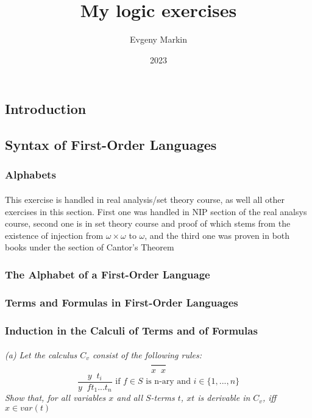 \documentclass[11pt,oneside,titlepage]{book}
\title{My logic exercises}
\author{Evgeny Markin}
\date{2023}
\DeclareMathOperator \spc {\text{ }}
\newcommand{\set}[1]{\{ #1 \}}
\begin{document}
\maketitle
\tableofcontents

\part{}

\chapter{Introduction}

\chapter{Syntax of First-Order Languages}

\section{Alphabets}

\subsection{}

This exercise is handled in real analysis/set theory course, as well all other exercises
in this section. First one was handled in NIP section of the real analsys course,
second one is in set theory course and proof of which stems from the existence of
injection from $\omega \times \omega$ to $\omega$, and the third one was proven in both
books under the section of Cantor's Theorem

\section{The Alphabet of a First-Order Language}

\section{Terms and Formulas in First-Order Languages}

\section{Induction in the Calculi of Terms and of Formulas}

\subsection{}

\textit{(a) Let the calculus $C_v$ consist of the following rules:
  $$\frac{}{x \spc x}$$
  $$\frac{y \spc t_i}{y \spc f t_1 ... t_n} \text{ if $f \in S$ is n-ary and
    $i \in \set{1, ..., n}$}$$
  Show that, for all variables $x$ and all $S$-terms $t$, $xt$ is derivable in $C_v$, iff
  $x \in var(t)$
}
\end{document}

